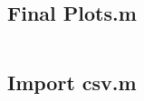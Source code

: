 \documentclass[notitlepage, a4paper, 11pt]{article}
\begin{document}
	\subsection*{Final Plots.m}
	\inputminted{matlab}{../Matlab/Final_Plots.m}
	\subsection*{Import csv.m}
	\inputminted{matlab}{../Matlab/RC_circuit.m}
\end{document}
